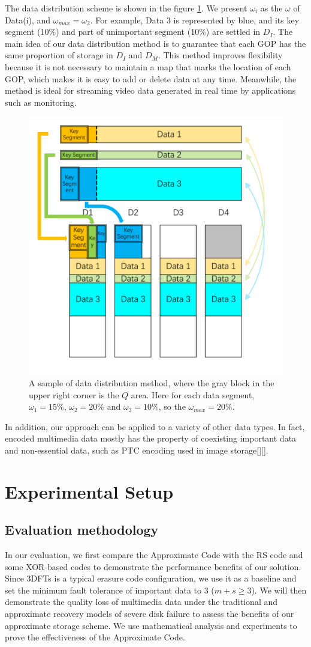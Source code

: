\documentclass[sigconf]{acmart}
\begin{document}
The data distribution scheme is shown in the figure \ref{Data-distribution-v2}. We present $\omega_i$ as the $\omega$ of Data(i), and $\omega_{max} = \omega_2$.
For example, Data 3 is represented by blue, and its key segment (10\%) and part of unimportant segment (10\%) are settled in $D_I$.
The main idea of our data distribution method is to guarantee that each GOP has the same proportion of storage in $D_I$ and $D_M$. This method improves flexibility because it is not necessary to maintain a map that marks the location of each GOP, which makes it is easy to add or delete data at any time. Meanwhile, the method is ideal for streaming video data generated in real time by applications such as monitoring.

\begin{figure}[htb]
\centering
\includegraphics[width=0.32 \textwidth]{photo/Data-distribution-v2.pdf}
\caption{A sample of data distribution method, where the gray block in the upper right corner is the $Q$ area. Here for each data segment, $\omega_1=15\%$, $\omega_2=20\%$ and $\omega_3=10\%$, so the $\omega_{max}=20\%$.}
\label{Data-distribution-v2}
\end{figure}

In addition, our approach can be applied to a variety of other data types. In fact, encoded multimedia data mostly has the property of coexisting important data and non-essential data, such as PTC encoding used in image storage[][].

\section{Experimental Setup}

\subsection{Evaluation methodology}
In our evaluation, we first compare the Approximate Code with the RS code and some XOR-based codes to demonstrate the performance benefits of our solution. Since 3DFTs is a typical erasure code configuration, we use it as a baseline and set the minimum fault tolerance of important data to 3 ($ m + s \geqslant 3 $). We will then demonstrate the quality loss of multimedia data under the traditional and approximate recovery models of severe disk failure to assess the benefits of our approximate storage scheme. We use mathematical analysis and experiments to prove the effectiveness of the Approximate Code.
\end{document}

